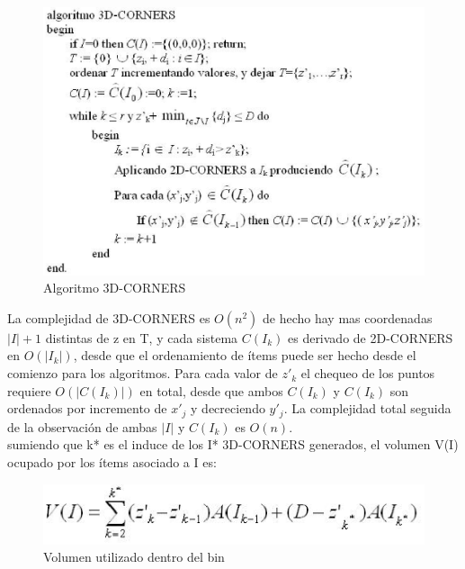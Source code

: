 \begin{figure}[!htb]
\centering
\includegraphics[scale=0.6]{fotos/foto4.eps}
\caption{Algoritmo 3D-CORNERS}
\end{figure}

La complejidad de 3D-CORNERS es \(O(n^2)\) de hecho hay mas coordenadas \(|I|+1\) distintas de  z en  T, y cada sistema \(C(I_k)\) es derivado de 2D-CORNERS en \(O(|I_k|)\), desde que el ordenamiento de ítems puede ser hecho desde el comienzo para los algoritmos. Para cada valor de  \(z'_k\) el chequeo de los puntos requiere \(O(|C(I_k)|)\) en total, desde que ambos \(C(I_k)\) y \(C(I_k)\) son ordenados por incremento de \(x'_j\) y decreciendo \(y'_j\). La complejidad total seguida de la observación de ambas \(|I|\) y \(C(I_k)\) es \(O(n)\).\\

sumiendo que k* es el induce de los I* 3D-CORNERS generados, el volumen V(I) ocupado por los ítems asociado a I es:\\

\begin{figure}[!htb]
\centering
\includegraphics[scale=0.6]{fotos/foto5.eps}
\caption{Volumen utilizado dentro del bin}
\end{figure}

